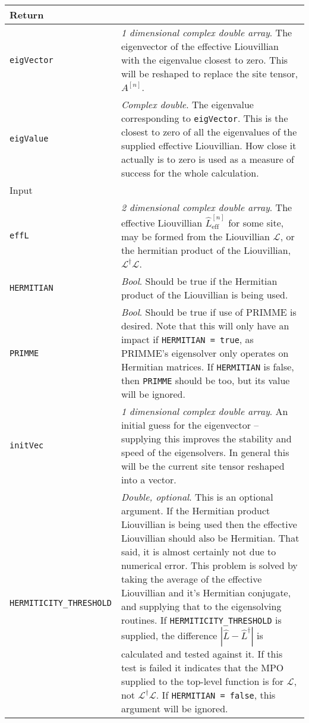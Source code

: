  \begin{longtabu}{X[1,1]X[4,1]}
 \hline
 Return & \\ \hline
 \lstinline$eigVector$ & \emph{1 dimensional complex double array}. The eigenvector of the effective Liouvillian with the eigenvalue closest to zero. This will be reshaped to replace the site tensor, \(A^{[n]}\). \\
 \lstinline$eigValue$ & \emph{Complex double}. The eigenvalue corresponding to \lstinline$eigVector$. This is the closest to zero of all the eigenvalues of the supplied effective Liouvillian. How close it actually is to zero is used as a measure of success for the whole calculation. \\ \hline
 Input & \\ \hline
 \lstinline$effL$ & \emph{2 dimensional complex double array}. The effective Liouvillian \(\hat{L}^{[n]}_{\mathrm{eff}}\) for some site, may be formed from the Liouvillian \(\mathcal{L}\), or the hermitian product of the Liouvillian, \(\mathcal{L}^{\dagger}\mathcal{L}\). \\
 \lstinline$HERMITIAN$ & \emph{Bool}. Should be true if the Hermitian product of the Liouvillian is being used. \\
 \lstinline$PRIMME$ & \emph{Bool}. Should be true if use of PRIMME is desired. Note that this will only have an impact if \lstinline$HERMITIAN = true$, as PRIMME's eigensolver only operates on Hermitian matrices. If \lstinline$HERMITIAN$ is false, then \lstinline$PRIMME$ should be too, but its value will be ignored. \\
 \lstinline$initVec$ & \emph{1 dimensional complex double array}. An initial guess for the eigenvector -- supplying this improves the stability and speed of the eigensolvers. In general this will be the current site tensor reshaped into a vector. \\
 \lstinline$HERMITICITY_THRESHOLD$ & \emph{Double, optional}. This is an optional argument. If the Hermitian product Liouvillian is being used then the effective Liouvillian should also be Hermitian. That said, it is almost certainly not due to numerical error. This problem is solved by taking the average of the effective Liouvillian and it's Hermitian conjugate, and supplying that to the eigensolving routines. If \lstinline$HERMITICITY_THRESHOLD$ is supplied, the difference \(|\hat{L} - \hat{L}^{\dagger}|\) is calculated and tested against it. If this test is failed it indicates that the MPO supplied to the top-level function is for \(\mathcal{L}\), not \(\mathcal{L}^{\dagger}\mathcal{L}\). If \lstinline$HERMITIAN = false$, this argument will be ignored.  \\
 \hline
 \end{longtabu}
